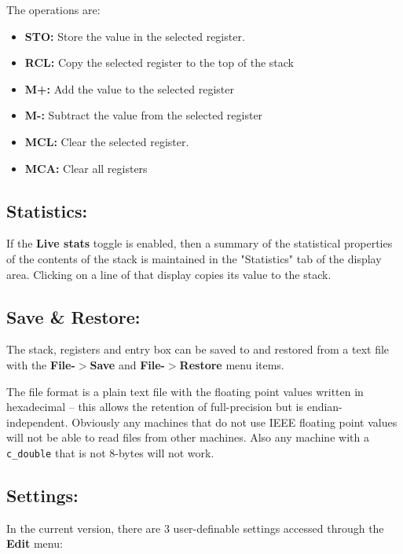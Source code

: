 \documentclass{article}
\begin{document}
  The operations are:
  \begin{itemize}
  \item \textbf{STO:} Store the value in the selected register.
  \item \textbf{RCL:} Copy the selected register to the top of the
    stack
  \item \textbf{M+:} Add the value to the selected register
  \item \textbf{M-:} Subtract the value from the selected register
  \item \textbf{MCL:} Clear the selected register.
  \item \textbf{MCA:} Clear all registers

  \end{itemize}

  \subsection{Statistics:}

  If the \textbf{Live stats} toggle is enabled, then a summary of the
  statistical properties of the contents of the stack is maintained in
  the "Statistics" tab of the display area. Clicking on a line of that
  display copies its value to the stack.

  \subsection{Save \& Restore:}

  The stack, registers and entry box can be saved to and restored from
  a text file with the \textbf{File-$>$Save} and
  \textbf{File-$>$Restore} menu items.

  The file format is a plain text file with the floating point values
  written in hexadecimal -- this allows the retention of full-precision
  but is endian-independent. Obviously any machines that do not use
  IEEE floating point values will not be able to read files from other
  machines. Also any machine with a \texttt{c\_double} that is not
  8-bytes will not work.

  \subsection{Settings:}

  In the current version, there are 3 user-definable settings accessed
  through the \textbf{Edit} menu:
\end{document}
